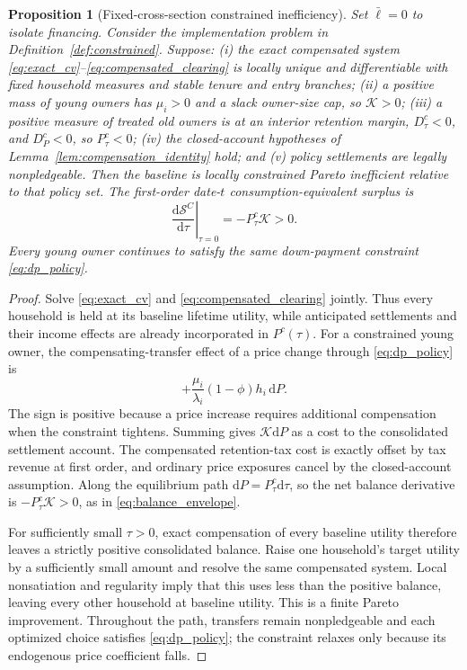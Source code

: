 \documentclass[11pt]{article}
\newtheorem{proposition}{Proposition}
\newcommand{\dd}{\mathrm d}
\newcommand{\1}{\mathbf 1}
\newcommand{\ellbar}{\bar\ell}
\begin{document}
\begin{proposition}[Fixed-cross-section constrained inefficiency]
\label{prop:constrained}
Set $\ellbar=0$ to isolate financing. Consider the implementation problem in
Definition~\ref{def:constrained}. Suppose: (i) the exact compensated system
\eqref{eq:exact_cv}--\eqref{eq:compensated_clearing} is locally unique and
differentiable with fixed household measures and stable tenure and entry
branches; (ii) a positive mass of young owners has $\mu_i>0$ and a slack
owner-size cap, so $\mathcal K>0$; (iii) a positive measure of treated old
owners is at an interior retention margin, $D_\tau^c<0$, and $D_P^c<0$, so
$P_\tau^c<0$; (iv) the closed-account hypotheses of
Lemma~\ref{lem:compensation_identity} hold; and (v) policy settlements are
legally nonpledgeable. Then the baseline
is locally constrained Pareto inefficient relative to that policy set. The
first-order date-$t$ consumption-equivalent surplus is
\begin{equation}
\boxed{
\left.\frac{\dd\mathcal S^C}{\dd\tau}\right|_{\tau=0}
=-P_\tau^c\mathcal K>0.}
\label{eq:constrained_surplus}
\end{equation}
Every young owner continues to satisfy the same down-payment constraint
\eqref{eq:dp_policy}.
\end{proposition}

\begin{proof}
Solve \eqref{eq:exact_cv} and \eqref{eq:compensated_clearing} jointly. Thus
every household is held at its baseline lifetime utility, while anticipated
settlements and their income effects are already incorporated in
$P^c(\tau)$. For a constrained young owner, the compensating-transfer effect
of a price change through \eqref{eq:dp_policy} is
\[
+\frac{\mu_i}{\lambda_i}(1-\phi)h_i\,\dd P.
\]
The sign is positive because a price increase requires additional compensation
when the constraint tightens. Summing gives $\mathcal K\dd P$ as a cost to the
consolidated settlement account. The compensated retention-tax cost is exactly
offset by tax revenue at first order, and ordinary price exposures cancel by
the closed-account assumption. Along the equilibrium path
$\dd P=P_\tau^c\dd\tau$, so the net balance derivative is
$-P_\tau^c\mathcal K>0$, as in \eqref{eq:balance_envelope}.

For sufficiently small $\tau>0$, exact compensation of every baseline utility
therefore leaves a strictly positive consolidated balance. Raise one
household's target utility by a sufficiently small amount and resolve the same
compensated system. Local nonsatiation and regularity imply that this uses less
than the positive balance, leaving every other household at baseline utility.
This is a finite Pareto improvement. Throughout the path, transfers remain
nonpledgeable and each optimized choice satisfies \eqref{eq:dp_policy}; the
constraint relaxes only because its endogenous price coefficient falls.
\end{proof}
\end{document}
